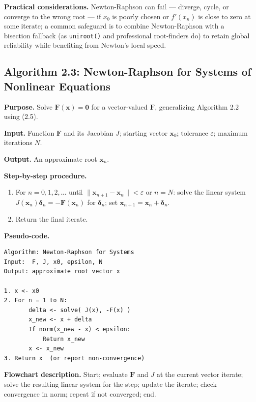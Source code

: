\documentclass[
]{article}
\providecommand{\tightlist}{%
  \setlength{\itemsep}{0pt}\setlength{\parskip}{0pt}}
\begin{document}
\textbf{Practical considerations.} Newton-Raphson can fail --- diverge,
cycle, or converge to the wrong root --- if \(x_0\) is poorly chosen or
\(f'(x_n)\) is close to zero at some iterate; a common safeguard is to
combine Newton-Raphson with a bisection fallback (as \texttt{uniroot()}
and professional root-finders do) to retain global reliability while
benefiting from Newton's local speed.

\subsection{Algorithm 2.3: Newton-Raphson for Systems of Nonlinear
Equations}\label{algorithm-2.3-newton-raphson-for-systems-of-nonlinear-equations}

\textbf{Purpose.} Solve \(\mathbf F(\mathbf x)=\mathbf 0\) for a
vector-valued \(\mathbf F\), generalizing Algorithm 2.2 using (2.5).

\textbf{Input.} Function \(\mathbf F\) and its Jacobian \(J\); starting
vector \(\mathbf x_0\); tolerance \(\varepsilon\); maximum iterations
\(N\).

\textbf{Output.} An approximate root \(\mathbf x_n\).

\textbf{Step-by-step procedure.}

\begin{enumerate}
\def\labelenumi{\arabic{enumi}.}
\tightlist
\item
  For \(n=0,1,2,\dots\) until \(\|\mathbf x_{n+1}-\mathbf x_n\|<
  \varepsilon\) or \(n=N\): solve the linear system
  \(J(\mathbf x_n)\boldsymbol\delta_n = -\mathbf F(\mathbf x_n)\) for
  \(\boldsymbol\delta_n\); set \(\mathbf x_{n+1} = \mathbf x_n +
  \boldsymbol\delta_n\).
\item
  Return the final iterate.
\end{enumerate}

\textbf{Pseudo-code.}

\begin{verbatim}
Algorithm: Newton-Raphson for Systems
Input:  F, J, x0, epsilon, N
Output: approximate root vector x

1. x <- x0
2. For n = 1 to N:
       delta <- solve( J(x), -F(x) )
       x_new <- x + delta
       If norm(x_new - x) < epsilon:
           Return x_new
       x <- x_new
3. Return x  (or report non-convergence)
\end{verbatim}

\textbf{Flowchart description.} Start; evaluate \(\mathbf F\) and \(J\)
at the current vector iterate; solve the resulting linear system for the
step; update the iterate; check convergence in norm; repeat if not
converged; end.
\end{document}
